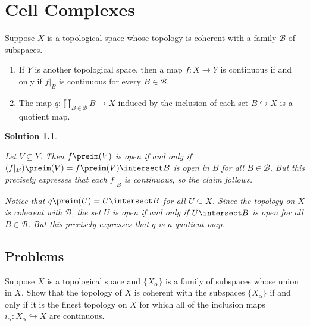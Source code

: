 \documentclass[article, a4paper, 11pt, oneside]{memoir}
\title{\doctitle}
\author{\docauthor}
\numberwithin{equation}{chapter}
\theoremstyle{nonumberplain}
\newtheorem{solution}{Solution}
\newcommand{\calB}{\mathcal{B}}
\begin{document}
\maketitle

\addtocounter{chapter}{4}
\chapter{Cell Complexes}

\begin{exerciseframed*}[3]
    Suppose $X$ is a topological space whose topology is coherent with a family $\calB$ of subspaces.
    \begin{enumerate}
        \item If $Y$ is another topological space, then a map $f \colon X \to Y$ is continuous if and only if $f|_B$ is continuous for every $B \in \calB$.
        \item The map $q \colon \coprod_{B\in\calB} B \to X$ induced by the inclusion of each set $B \hookrightarrow X$ is a quotient map.
    \end{enumerate}
\end{exerciseframed*}

\begin{solution}
\begin{solutionsec}
    \item Let $V \subseteq Y$. Then $f\preim(V)$ is open if and only if $(f|_B)\preim(V) = f\preim(V) \intersect B$ is open in $B$ for all $B \in \calB$. But this precisely expresses that each $f|_B$ is continuous, so the claim follows.

    \item Notice that $q\preim(U) = U \intersect B$ for all $U \subseteq X$. Since the topology on $X$ is coherent with $\calB$, the set $U$ is open if and only if $U \intersect B$ is open for all $B \in \calB$. But this precisely expresses that $q$ is a quotient map.
\end{solutionsec}
\end{solution}


\section*{Problems}

\begin{problemframed*}[5]
    Suppose $X$ is a topological space and $\{X_\alpha\}$ is a family of subspaces whose union in $X$. Show that the topology of $X$ is coherent with the subspaces $\{X_\alpha\}$ if and only if it is the finest topology on $X$ for which all of the inclusion maps $i_\alpha \colon X_\alpha \hookrightarrow X$ are continuous.
\end{problemframed*}
\end{document}
